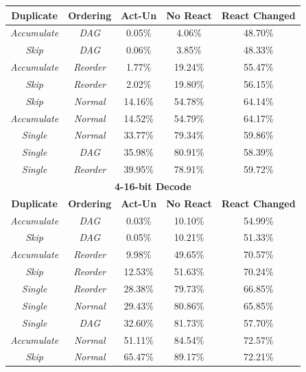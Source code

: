 \documentclass[journal]{IEEEtran}
\begin{document}
\begin{table}
\begin{tabular}{|c|c|c|c|c|}
\textbf{Duplicate} & \textbf{Ordering} & \textbf{Act-Un} & \textbf{No React} & \textbf{React Changed} \\ \hline
 \emph{Accumulate} &     \emph{DAG} & 0.05\% & 4.06\% & 48.70\% \\ \hline
       \emph{Skip} &     \emph{DAG} & 0.06\% & 3.85\% & 48.33\% \\ \hline
 \emph{Accumulate} & \emph{Reorder} & 1.77\% & 19.24\% & 55.47\% \\ \hline
       \emph{Skip} & \emph{Reorder} & 2.02\% & 19.80\% & 56.15\% \\ \hline
   \rowcolor{Gray}
       \emph{Skip} &  \emph{Normal} & 14.16\% & 54.78\% & 64.14\% \\ \hline
 \emph{Accumulate} &  \emph{Normal} & 14.52\% & 54.79\% & 64.17\% \\ \hline
     \emph{Single} &  \emph{Normal} & 33.77\% & 79.34\% & 59.86\% \\ \hline
     \emph{Single} &     \emph{DAG} & 35.98\% & 80.91\% & 58.39\% \\ \hline
     \emph{Single} & \emph{Reorder} & 39.95\% & 78.91\% & 59.72\% \\ \hline\hline

  \multicolumn{5}{|c|}{\textbf{4-16-bit Decode}} \\ \hline

\textbf{Duplicate} & \textbf{Ordering} & \textbf{Act-Un} & \textbf{No React} & \textbf{React Changed} \\ \hline
 \emph{Accumulate} &     \emph{DAG} & 0.03\% & 10.10\% & 54.99\% \\ \hline
       \emph{Skip} &     \emph{DAG} & 0.05\% & 10.21\% & 51.33\% \\ \hline
 \emph{Accumulate} & \emph{Reorder} & 9.98\% & 49.65\% & 70.57\% \\ \hline
       \emph{Skip} & \emph{Reorder} & 12.53\% & 51.63\% & 70.24\% \\ \hline
     \emph{Single} & \emph{Reorder} & 28.38\% & 79.73\% & 66.85\% \\ \hline
     \emph{Single} &  \emph{Normal} & 29.43\% & 80.86\% & 65.85\% \\ \hline
     \emph{Single} &     \emph{DAG} & 32.60\% & 81.73\% & 57.70\% \\ \hline
 \emph{Accumulate} &  \emph{Normal} & 51.11\% & 84.54\% & 72.57\% \\ \hline
   \rowcolor{Gray}
       \emph{Skip} &  \emph{Normal} & 65.47\% & 89.17\% & 72.21\% \\ \hline\hline


\end{tabular}
\end{table}
\end{document}
